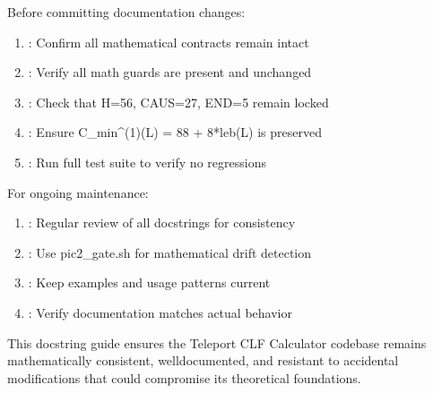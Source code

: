 \documentclass[letterpaper,10pt,english]{sphinxmanual}
\begin{document}
\sphinxAtStartPar
Before committing documentation changes:
\begin{enumerate}
%
\item {} 
\sphinxAtStartPar
{}: Confirm all mathematical contracts remain intact

\item {} 
\sphinxAtStartPar
{}: Verify all math guards are present and unchanged

\item {} 
\sphinxAtStartPar
{}: Check that H=56, CAUS=27, END=5 remain locked

\item {} 
\sphinxAtStartPar
{}: Ensure C\_min\textasciicircum{}(1)(L) = 88 + 8*leb(L) is preserved

\item {} 
\sphinxAtStartPar
{}: Run full test suite to verify no regressions

\end{enumerate}

\sphinxAtStartPar
{}

\sphinxAtStartPar
For ongoing maintenance:
\begin{enumerate}
%
\item {} 
\sphinxAtStartPar
{}: Regular review of all docstrings for consistency

\item {} 
\sphinxAtStartPar
{}: Use pic2\_gate.sh for mathematical drift detection

\item {} 
\sphinxAtStartPar
{}: Keep examples and usage patterns current

\item {} 
\sphinxAtStartPar
{}: Verify documentation matches actual behavior

\end{enumerate}

\sphinxAtStartPar
This docstring guide ensures the Teleport CLF Calculator codebase remains mathematically consistent, well\sphinxhyphen{}documented, and resistant to accidental modifications that could compromise its theoretical foundations.
\end{document}
